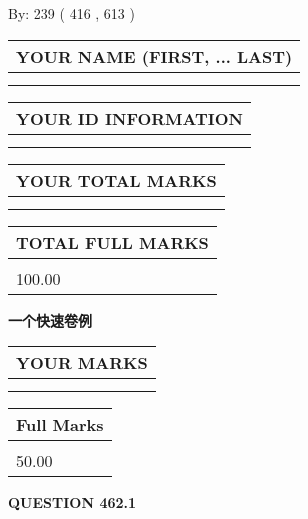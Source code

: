 \documentclass{ctexart}
\begin{document}
   
\hspace{1.0in} By: 
 239 ( 416 ,  613 )
   
   
   
   
\newpage 
\setcounter{page}{ 
   462001 } 
   
   
   
   
\noindent\begin{tabular}{|l|}
\hline
YOUR NAME (FIRST, ... LAST)  \\
\hline
 \\ 
 \\ 
\hline
\end{tabular}
\hspace{0.05in} \begin{tabular}{|l|}
\hline
 YOUR   ID   INFORMATION  \\
\hline
 \\ 
 \\ 
\hline
\end{tabular}
   
   
\vspace{0.2in}\noindent\begin{tabular}{|l|}
\hline
YOUR TOTAL MARKS  \\
\hline
 \\ 
 \\ 
\hline
\end{tabular}
\hspace{0.05in} \begin{tabular}{|l|}
\hline
TOTAL FULL MARKS  \\
\hline
 \\ 
100.00 \\
\hline
\end{tabular}
   
   
 \vspace{0.2in}
{\LARGE {\textbf{ 一个快速卷例}}}
   
   
  
\vspace{0.2in}
  
\noindent\begin{tabular}{|l|}
\hline
 YOUR MARKS  \\
\hline
 \\ 
 \\ 
\hline
\end{tabular}
\hspace{0.05in} \begin{tabular}{|l|}
\hline
 Full Marks  \\
\hline
 \\ 
50.00 \\
\hline
\end{tabular}
{\textbf{\Large{QUESTION
462.1 
}}}
  
\end{document}

